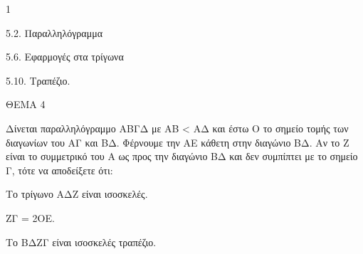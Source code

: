 \begin{ylh}{1}
    \item 5.2. Παραλληλόγραμμα
    \item 5.6. Εφαρμογές στα τρίγωνα
    \item 5.10. Τραπέζιο.
\end{ylh}

ΘΕΜΑ 4

Δίνεται παραλληλόγραμμο ΑΒΓΔ με ΑΒ \textless{} ΑΔ και έστω Ο το σημείο τομής των διαγωνίων του ΑΓ και ΒΔ. Φέρνουμε την ΑΕ κάθετη στην διαγώνιο ΒΔ. Αν το Ζ είναι το συμμετρικό του Α ως προς την διαγώνιο ΒΔ και δεν συμπίπτει με το σημείο Γ, τότε να αποδείξετε ότι:

\begin{alist}
\item Το τρίγωνο ΑΔΖ είναι ισοσκελές. 

\item ΖΓ = 2ΟΕ. 

\item Το ΒΔΖΓ είναι ισοσκελές τραπέζιο. 


\end{alist}
